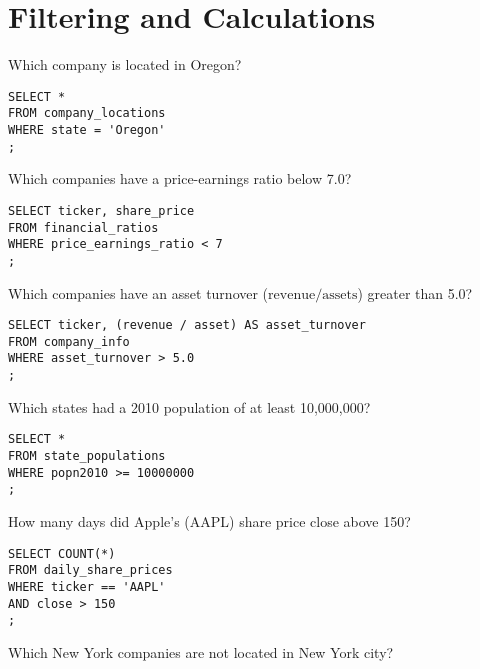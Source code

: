 \documentclass[10pt]{exam}
\begin{document}
\section{Filtering and Calculations}
\begin{questions}


\question Which company is located in Oregon?

\begin{solution}
\begin{lstlisting}
SELECT *
FROM company_locations
WHERE state = 'Oregon'
;
\end{lstlisting}
\end{solution}


\question Which companies have a price-earnings ratio below 7.0?

\begin{solution}
\begin{lstlisting}
SELECT ticker, share_price
FROM financial_ratios
WHERE price_earnings_ratio < 7
;
\end{lstlisting}
\end{solution}


\question Which companies have an asset turnover ($\textrm{revenue} /
\textrm{assets}$) greater than 5.0?

\begin{solution}
\begin{lstlisting}
SELECT ticker, (revenue / asset) AS asset_turnover
FROM company_info
WHERE asset_turnover > 5.0
;
\end{lstlisting}
\end{solution}


\question Which states had a 2010 population of at least 10,000,000?

\begin{solution}
\begin{lstlisting}
SELECT *
FROM state_populations
WHERE popn2010 >= 10000000
;
\end{lstlisting}
\end{solution}


\question How many days did Apple's (AAPL) share price close above 150?

\begin{solution}
\begin{lstlisting}
SELECT COUNT(*)
FROM daily_share_prices
WHERE ticker == 'AAPL'
AND close > 150
;
\end{lstlisting}
\end{solution}


\question Which New York companies are not located in New York city?


\end{questions}
\end{document}
